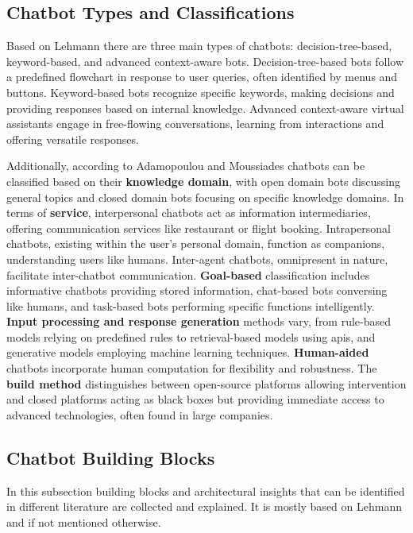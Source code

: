\subsection{Chatbot Types and Classifications}
Based on Lehmann \cite{lehmann_chatbot-guide_2021} there are three main types of chatbots: decision-tree-based, keyword-based, and advanced context-aware bots. 
Decision-tree-based bots follow a predefined flowchart in response to user queries, often identified by menus and buttons. 
Keyword-based bots recognize specific keywords, making decisions and providing responses based on internal knowledge. 
Advanced context-aware virtual assistants engage in free-flowing conversations, learning from interactions and offering versatile responses.

Additionally, according to Adamopoulou and Moussiades \cite{adamopoulou_overview_2020} chatbots can be classified based on their \textbf{knowledge domain}, with open domain bots discussing general topics and closed domain bots focusing on specific knowledge domains. 
In terms of \textbf{service}, interpersonal chatbots act as information intermediaries, offering communication services like restaurant or flight booking. 
Intrapersonal chatbots, existing within the user's personal domain, function as companions, understanding users like humans. 
Inter-agent chatbots, omnipresent in nature, facilitate inter-chatbot communication. 
\textbf{Goal-based} classification includes informative chatbots providing stored information, chat-based bots conversing like humans, and task-based bots performing specific functions intelligently. 
\textbf{Input processing and response generation} methods vary, from rule-based models relying on predefined rules to retrieval-based models using \glspl{api}, and generative models employing machine learning techniques. 
\textbf{Human-aided} chatbots incorporate human computation for flexibility and robustness.
The \textbf{build method} distinguishes between open-source platforms allowing intervention and closed platforms acting as black boxes but providing immediate access to advanced technologies, often found in large companies.

\subsection{Chatbot Building Blocks}
In this subsection building blocks and architectural insights that can be identified in different literature are collected and explained. 
It is mostly based on Lehmann \cite{lehmann_chatbot-guide_2021} and \cite{adamopoulou_overview_2020} if not mentioned otherwise.

